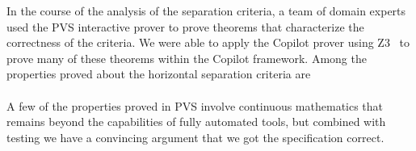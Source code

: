 In the course of the analysis of the separation criteria, a team of
domain experts used the PVS interactive prover to prove theorems that
characterize the correctness of the criteria.  We were able to apply
the Copilot prover using Z3~\cite{DeMoura2008} to prove many of these theorems
within the Copilot framework. Among the properties proved about the
horizontal separation criteria are


 \vspace{\belowdisplayskip}

\noindent 
\paragraph{}A few of the properties proved in PVS involve continuous mathematics
that remains beyond the capabilities of fully automated tools,
but combined with testing we have a convincing argument that we got the
specification correct. 


%
%




